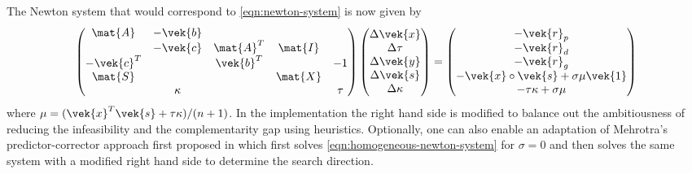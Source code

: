 The Newton system that would correspond to \cref{eqn:newton-system} is now given by
\begin{equation}\label{eqn:homogeneous-newton-system}
  \begin{pmatrix}
    \mat{A}    & -\vek{b} &           &         &         \\
               & -\vek{c} & \mat{A}^T & \mat{I} &         \\
    -\vek{c}^T &          & \vek{b}^T &         & -1 \\
    \mat{S}    &          &           & \mat{X} &         \\
               & \kappa   &           &         & \tau
  \end{pmatrix}
  \begin{pmatrix}
    \Delta\vek{x} \\
    \Delta\tau \\
    \Delta\vek{y} \\
    \Delta\vek{s} \\
    \Delta\kappa
  \end{pmatrix}
  =
  \begin{pmatrix}
    -\vek{r}_p \\
    -\vek{r}_d \\
    -\vek{r}_g \\
    -\vek{x} \circ \vek{s} + \sigma \mu \vek{1} \\
    -\tau \kappa + \sigma \mu
  \end{pmatrix}
\end{equation}
where \(\mu = (\vek{x}^T \vek{s} + \tau \kappa)/(n+1)\).
In the implementation the right hand side is modified to balance out the ambitiousness of reducing the infeasibility and the complementarity gap using heuristics.
Optionally, one can also enable an adaptation of Mehrotra's predictor-corrector approach first proposed in \cite{Mehrotra-PredictorCorrector} which first solves \cref{eqn:homogeneous-newton-system} for \(\sigma = 0\) and then solves the same system with a modified right hand side to determine the search direction.

